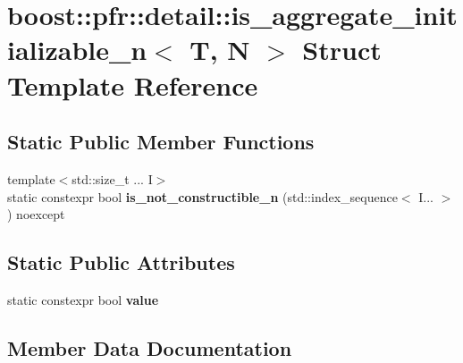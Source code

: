 \hypertarget{structboost_1_1pfr_1_1detail_1_1is__aggregate__initializable__n}{}\section{boost\+:\+:pfr\+:\+:detail\+:\+:is\+\_\+aggregate\+\_\+initializable\+\_\+n$<$ T, N $>$ Struct Template Reference}
\label{structboost_1_1pfr_1_1detail_1_1is__aggregate__initializable__n}
\subsection*{Static Public Member Functions}
\begin{DoxyCompactItemize}
\item 
\mbox{\label{structboost_1_1pfr_1_1detail_1_1is__aggregate__initializable__n_ade250280aac62f4c27e9269432776eca}} 
{\footnotesize template$<$std\+::size\+\_\+t ... I$>$ }\\static constexpr bool {\bfseries is\+\_\+not\+\_\+constructible\+\_\+n} (std\+::index\+\_\+sequence$<$ I... $>$) noexcept
\end{DoxyCompactItemize}
\subsection*{Static Public Attributes}
\begin{DoxyCompactItemize}
\item 
static constexpr bool {\bfseries value}
\end{DoxyCompactItemize}


\subsection{Member Data Documentation}
\mbox{\label{structboost_1_1pfr_1_1detail_1_1is__aggregate__initializable__n_a5e9ce35a9a4aab22d9b4d9a7b22a58bf}} 
